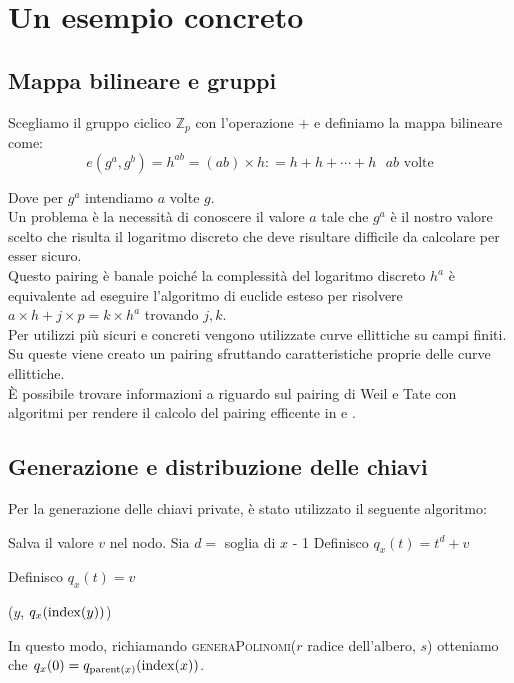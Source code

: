 \chapter{Un esempio concreto}

\section{Mappa bilineare e gruppi}

Scegliamo il gruppo ciclico $\mathbb{Z}_{p}$ con l'operazione $+$ e definiamo la mappa bilineare come:
\[ e(g^a,g^b) = h^{ab} = (ab) \times h : = h + h + \cdots + h \text{ $ab$ volte}\]

Dove per $g^a$ intendiamo $a$ volte $g$.\\


Un problema è la necessità di conoscere il valore $a$ tale che $g^a$ è il nostro valore scelto che risulta il logaritmo discreto che deve risultare difficile da calcolare per esser sicuro.\\
Questo pairing è banale poiché la complessità del logaritmo discreto $h^a$ è equivalente ad eseguire l'algoritmo di euclide esteso per risolvere $a \times h + j \times p = k \times h^a$ trovando $j,k$.\\


Per utilizzi più sicuri e concreti vengono utilizzate curve ellittiche su campi finiti. Su queste viene creato un pairing sfruttando caratteristiche proprie delle curve ellittiche.\\
È possibile trovare informazioni a riguardo sul pairing di Weil e Tate con algoritmi per rendere il calcolo del pairing efficente in \cite{benoit} e \cite{maas}.


\section{Generazione e distribuzione delle chiavi}

Per la generazione delle chiavi private, è stato utilizzato il seguente algoritmo:
\vspace{0.3cm}
\begin{algorithmic}
   		\State Salva il valore $v$ nel nodo.
   \Else
   		\State Sia $d = $ soglia di $x$ - 1
   			\State Definisco $q_x(t) = t^d + v$ 

   		\Else
   			\State Definisco $q_x(t) = v$
   		
   		\EndIf

   			($y$, $q_x(\operatorname{index}(y))$) 
   		\EndFor
   \EndIf
\EndFunction
\end{algorithmic}
\vspace{0.3cm}
In questo modo, richiamando {\scshape generaPolinomi}($r$ radice dell'albero, $s$) otteniamo che $q_x(0) = q_{\operatorname{parent}(x)}(\operatorname{index}(x))$.\label{polinomi}\\[1cm]

